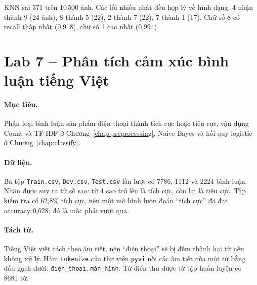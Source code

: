 
KNN sai 371 trên 10\,500 ảnh. Các lỗi nhiều nhất đều hợp lý về hình dạng: 4 nhận thành 9 (24 ảnh), 8 thành 5 (22), 2 thành 7 (22), 7 thành 1 (17). Chữ số 8 có recall thấp nhất (0,918), chữ số 1 cao nhất (0,994).

\section{Lab 7 -- Phân tích cảm xúc bình luận tiếng Việt}
\label{sec:lab-sentiment}

\paragraph{Mục tiêu.} Phân loại bình luận sản phẩm điện thoại thành tích cực hoặc tiêu cực, vận dụng Count và TF-IDF ở Chương~\ref{chap:preprocessing}, Naive Bayes và hồi quy logistic ở Chương~\ref{chap:classify}.

\paragraph{Dữ liệu.} Ba tệp \texttt{Train.csv}, \texttt{Dev.csv}, \texttt{Test.csv} lần lượt có 7786, 1112 và 2224 bình luận. Nhãn được suy ra từ số sao: từ 4 sao trở lên là tích cực, còn lại là tiêu cực. Tập kiểm tra có 62,8\% tích cực, nên một mô hình luôn đoán ``tích cực'' đã đạt accuracy 0,628; đó là mốc phải vượt qua.

\paragraph{Tách từ.} Tiếng Việt viết cách theo âm tiết, nên ``điện thoại'' sẽ bị đếm thành hai từ nếu không xử lý. Hàm \texttt{tokenize} của thư viện \texttt{pyvi} nối các âm tiết của một từ bằng dấu gạch dưới: \texttt{điện\_thoại}, \texttt{màn\_hình}. Từ điển thu được từ tập huấn luyện có 8681 từ.

